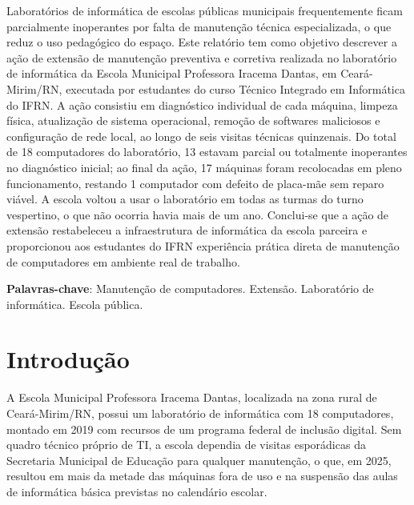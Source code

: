 \documentclass[article,12pt,a4paper,oneside]{abntex2}
\begin{document}
\maketitle

\begin{resumo}
Laboratórios de informática de escolas públicas municipais frequentemente
ficam parcialmente inoperantes por falta de manutenção técnica
especializada, o que reduz o uso pedagógico do espaço. Este relatório tem
como objetivo descrever a ação de extensão de manutenção preventiva e
corretiva realizada no laboratório de informática da Escola Municipal
Professora Iracema Dantas, em Ceará-Mirim/RN, executada por estudantes do
curso Técnico Integrado em Informática do IFRN. A ação consistiu em
diagnóstico individual de cada máquina, limpeza física, atualização de
sistema operacional, remoção de softwares maliciosos e configuração de
rede local, ao longo de seis visitas técnicas quinzenais. Do total de 18
computadores do laboratório, 13 estavam parcial ou totalmente inoperantes
no diagnóstico inicial; ao final da ação, 17 máquinas foram recolocadas em
pleno funcionamento, restando 1 computador com defeito de placa-mãe sem
reparo viável. A escola voltou a usar o laboratório em todas as turmas do
turno vespertino, o que não ocorria havia mais de um ano. Conclui-se que a
ação de extensão restabeleceu a infraestrutura de informática da escola
parceira e proporcionou aos estudantes do IFRN experiência prática direta
de manutenção de computadores em ambiente real de trabalho.

\vspace{\onelineskip}
\noindent
\textbf{Palavras-chave}: Manutenção de computadores. Extensão. Laboratório de informática. Escola pública.
\end{resumo}

\textual

\section{Introdução}

A Escola Municipal Professora Iracema Dantas, localizada na zona rural de
Ceará-Mirim/RN, possui um laboratório de informática com 18 computadores,
montado em 2019 com recursos de um programa federal de inclusão digital.
Sem quadro técnico próprio de TI, a escola dependia de visitas esporádicas
da Secretaria Municipal de Educação para qualquer manutenção, o que, em
2025, resultou em mais da metade das máquinas fora de uso e na suspensão
das aulas de informática básica previstas no calendário escolar.
\end{document}
